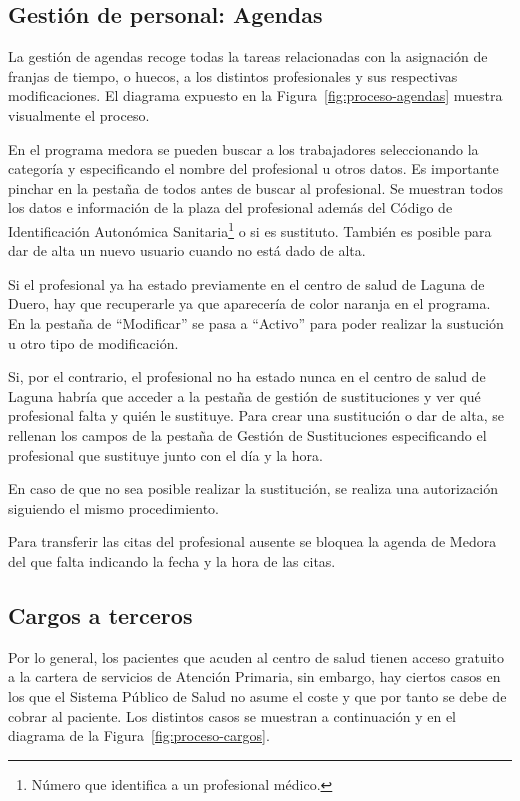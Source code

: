 \subsection{Gestión de personal: Agendas}

La gestión de agendas recoge todas la tareas relacionadas con la asignación de franjas de tiempo, o huecos, a los distintos profesionales y sus respectivas modificaciones. El diagrama expuesto en la Figura~\ref{fig:proceso-agendas} muestra visualmente el proceso.

En el programa \Gls{medora} se pueden buscar a los trabajadores seleccionando la categoría y especificando el nombre del profesional u otros datos.
Es importante pinchar en la pestaña de todos antes de buscar al profesional.
Se muestran todos los datos e información de la plaza del profesional además del Código de Identificación Autonómica Sanitaria\footnote{Número que identifica a un profesional médico.} o si es sustituto.
También es posible para dar de alta un nuevo usuario cuando no está dado de alta.

Si el profesional ya ha estado previamente en el centro de salud de Laguna de Duero, hay que recuperarle ya que aparecería de color naranja en el programa.
En la pestaña de ``Modificar'' se pasa a ``Activo'' para poder realizar la sustución u otro tipo de modificación.

Si, por el contrario, el profesional no ha estado nunca en el centro de salud de Laguna habría que acceder a la pestaña de gestión de sustituciones y ver qué profesional falta y quién le sustituye.
Para crear una sustitución o dar de alta, se rellenan los campos de la pestaña de Gestión de Sustituciones especificando el profesional que sustituye junto con el día y la hora.

En caso de que no sea posible realizar la sustitución, se realiza una autorización siguiendo el mismo procedimiento.

Para transferir las citas del profesional ausente se bloquea la agenda de Medora del que falta indicando la fecha y la hora de las citas.

\subsection{Cargos a terceros}

Por lo general, los pacientes que acuden al centro de salud tienen acceso gratuito a la cartera de servicios de Atención Primaria, sin embargo, hay ciertos casos en los que el Sistema Público de Salud no asume el coste y que por tanto se debe de cobrar al paciente. Los distintos casos se muestran a continuación y en el diagrama de la Figura~\ref{fig:proceso-cargos}.

